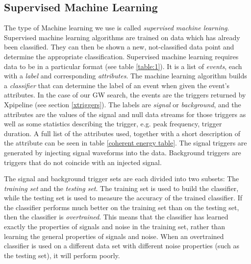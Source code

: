 \documentclass[11pt]{cuthesis}
\begin{document}
\subsection{Supervised Machine Learning}
The type of Machine learning we use is called \textit{supervised machine learning}. Supervised machine learning algorithms are trained on data which has already been classified. They can then be shown a new, not-classified data point and determine the appropriate classification. Supervised machine learning requires data to be in a particular format (see table \ref{table:1}). It is a list of \emph{events}, each with a \emph{label} and corresponding \emph{attributes}. The machine learning algorithm builds a \textit{classifier} that can determine the label of an event when given the event's attributes. In the case of our GW search, the events are the triggers returned by Xpipeline (see section \ref{xtriggers}). The labels are \textit{signal} or \textit{background}, and the attributes are the values of the signal and null data streams for those triggers as well as some statistics describing the trigger, e.g. peak frequency, trigger duration. A full list of the attributes used, together with a short description of the attribute can be seen in table \ref{coherent energy table}. The signal triggers are generated by injecting signal waveforms into the data. Background triggers are triggers that do not coincide with an injected signal.


The signal and background trigger sets are each divided into two subsets: The \emph{training set} and the \emph{testing set}. The training set is used to build the classifier, while the testing set is used to measure the accuracy of the trained classifier. If the classifier performs much better on the training set than on the testing set, then the classifier is \emph{overtrained}. This means that the classifier has learned exactly the properties of signals and noise in the training set, rather than learning the general properties of signals and noise. When an overtrained classifier is used on a different data set with different noise properties (such as the testing set), it will perform poorly. 
\end{document}
